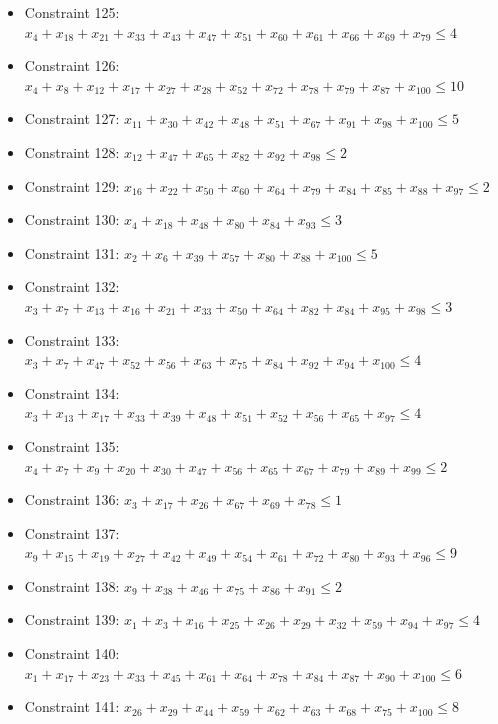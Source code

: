 \documentclass[11pt]{article}
\begin{document}
\begin{itemize}
\item Constraint 125: $x_{4} + x_{18} + x_{21} + x_{33} + x_{43} + x_{47} + x_{51} + x_{60} + x_{61} + x_{66} + x_{69} + x_{79} \le 4$
\item Constraint 126: $x_{4} + x_{8} + x_{12} + x_{17} + x_{27} + x_{28} + x_{52} + x_{72} + x_{78} + x_{79} + x_{87} + x_{100} \le 10$
\item Constraint 127: $x_{11} + x_{30} + x_{42} + x_{48} + x_{51} + x_{67} + x_{91} + x_{98} + x_{100} \le 5$
\item Constraint 128: $x_{12} + x_{47} + x_{65} + x_{82} + x_{92} + x_{98} \le 2$
\item Constraint 129: $x_{16} + x_{22} + x_{50} + x_{60} + x_{64} + x_{79} + x_{84} + x_{85} + x_{88} + x_{97} \le 2$
\item Constraint 130: $x_{4} + x_{18} + x_{48} + x_{80} + x_{84} + x_{93} \le 3$
\item Constraint 131: $x_{2} + x_{6} + x_{39} + x_{57} + x_{80} + x_{88} + x_{100} \le 5$
\item Constraint 132: $x_{3} + x_{7} + x_{13} + x_{16} + x_{21} + x_{33} + x_{50} + x_{64} + x_{82} + x_{84} + x_{95} + x_{98} \le 3$
\item Constraint 133: $x_{3} + x_{7} + x_{47} + x_{52} + x_{56} + x_{63} + x_{75} + x_{84} + x_{92} + x_{94} + x_{100} \le 4$
\item Constraint 134: $x_{3} + x_{13} + x_{17} + x_{33} + x_{39} + x_{48} + x_{51} + x_{52} + x_{56} + x_{65} + x_{97} \le 4$
\item Constraint 135: $x_{4} + x_{7} + x_{9} + x_{20} + x_{30} + x_{47} + x_{56} + x_{65} + x_{67} + x_{79} + x_{89} + x_{99} \le 2$
\item Constraint 136: $x_{3} + x_{17} + x_{26} + x_{67} + x_{69} + x_{78} \le 1$
\item Constraint 137: $x_{9} + x_{15} + x_{19} + x_{27} + x_{42} + x_{49} + x_{54} + x_{61} + x_{72} + x_{80} + x_{93} + x_{96} \le 9$
\item Constraint 138: $x_{9} + x_{38} + x_{46} + x_{75} + x_{86} + x_{91} \le 2$
\item Constraint 139: $x_{1} + x_{3} + x_{16} + x_{25} + x_{26} + x_{29} + x_{32} + x_{59} + x_{94} + x_{97} \le 4$
\item Constraint 140: $x_{1} + x_{17} + x_{23} + x_{33} + x_{45} + x_{61} + x_{64} + x_{78} + x_{84} + x_{87} + x_{90} + x_{100} \le 6$
\item Constraint 141: $x_{26} + x_{29} + x_{44} + x_{59} + x_{62} + x_{63} + x_{68} + x_{75} + x_{100} \le 8$

\end{itemize}
\end{document}
